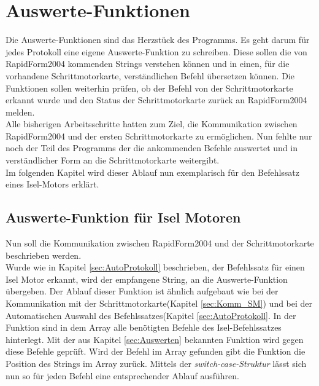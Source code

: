 \lstset{language=C, basicstyle=\footnotesize, showstringspaces=false, tabsize=8}


\lstset{language=C, basicstyle=\footnotesize, showstringspaces=false, tabsize=8}


\section{Auswerte-Funktionen}
\label{sec:Auswerten_RF}
Die Auswerte-Funktionen sind das Herzstück des Programms. Es geht darum für jedes Protokoll eine eigene Auswerte-Funktion zu schreiben. Diese sollen die von RapidForm2004 kommenden Strings verstehen können und in einen, für die vorhandene Schrittmotorkarte, verständlichen Befehl übersetzen können. Die Funktionen sollen weiterhin prüfen, ob der Befehl von der Schrittmotorkarte erkannt wurde und den Status der Schrittmotorkarte zurück an RapidForm2004 melden.\\
Alle bisherigen Arbeitsschritte hatten zum Ziel, die Kommunikation zwischen RapidForm2004 und der ersten Schrittmotorkarte zu ermöglichen. Nun fehlte nur noch der Teil des Programms der die ankommenden Befehle auswertet und in verständlicher Form an die Schrittmotorkarte weitergibt.\\
Im folgenden Kapitel wird dieser Ablauf nun exemplarisch für den Befehlssatz eines Isel-Motors erklärt.

\subsection{Auswerte-Funktion für Isel Motoren}
Nun soll die Kommunikation zwischen RapidForm2004 und der Schrittmotorkarte beschrieben werden.\\
Wurde wie in Kapitel \ref{sec:AutoProtokoll} beschrieben, der Befehlssatz für einen Isel Motor erkannt, wird der empfangene String, an die Auswerte-Funktion  übergeben. Der Ablauf dieser Funktion ist ähnlich aufgebaut wie bei der Kommunikation mit der Schrittmotorkarte(Kapitel \ref{sec:Komm_SM}) und bei der Automatischen Auswahl des Befehlssatzes(Kapitel \ref{sec:AutoProtokoll}. In der Funktion  sind in dem Array  alle benötigten Befehle des Isel-Befehlssatzes hinterlegt. Mit der aus Kapitel \ref{sec:Auswerten} bekannten Funktion  wird   gegen diese Befehle geprüft. Wird der Befehl im Array gefunden gibt die Funktion  die Position des Strings im Array zurück. Mittels der \emph{switch-case-Struktur} lässt sich nun so für jeden Befehl eine entsprechender Ablauf ausführen. 

